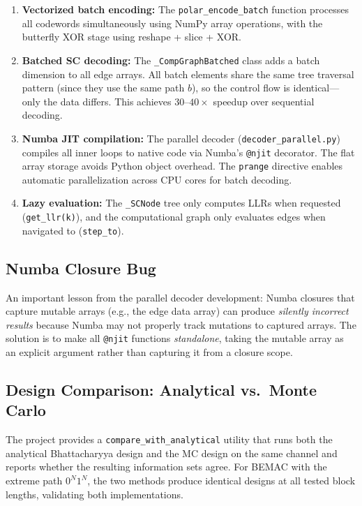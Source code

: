 \documentclass[11pt,a4paper]{article}
\begin{document}
\begin{enumerate}
  \item \textbf{Vectorized batch encoding:} The \texttt{polar\_encode\_batch}
        function processes all codewords simultaneously using NumPy array
        operations, with the butterfly XOR stage using reshape + slice + XOR.

  \item \textbf{Batched SC decoding:} The \texttt{\_CompGraphBatched} class
        adds a batch dimension to all edge arrays. All batch elements share
        the same tree traversal pattern (since they use the same path $b$),
        so the control flow is identical---only the data differs. This
        achieves $30$--$40\times$ speedup over sequential decoding.

  \item \textbf{Numba JIT compilation:} The parallel decoder
        (\texttt{decoder\_parallel.py}) compiles all inner loops to native
        code via Numba's \texttt{@njit} decorator. The flat array storage
        avoids Python object overhead. The \texttt{prange} directive enables
        automatic parallelization across CPU cores for batch decoding.

  \item \textbf{Lazy evaluation:} The \texttt{\_SCNode} tree only computes
        LLRs when requested (\texttt{get\_llr(k)}), and the computational
        graph only evaluates edges when navigated to (\texttt{step\_to}).
\end{enumerate}

\subsection{Numba Closure Bug}

An important lesson from the parallel decoder development: Numba closures
that capture mutable arrays (e.g., the edge data array) can produce
\emph{silently incorrect results} because Numba may not properly track
mutations to captured arrays. The solution is to make all \texttt{@njit}
functions \emph{standalone}, taking the mutable array as an explicit
argument rather than capturing it from a closure scope.

\subsection{Design Comparison: Analytical vs.\ Monte Carlo}

The project provides a \texttt{compare\_with\_analytical} utility that runs
both the analytical Bhattacharyya design and the MC design on the same
channel and reports whether the resulting information sets agree. For BEMAC
with the extreme path $0^N 1^N$, the two methods produce identical designs
at all tested block lengths, validating both implementations.
\end{document}
